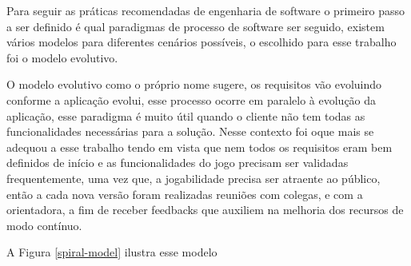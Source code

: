 Para seguir as práticas recomendadas de engenharia de software o primeiro passo a ser definido é qual paradigmas de processo de software ser seguido, existem vários modelos para diferentes cenários possíveis, o escolhido para esse trabalho foi o modelo evolutivo.

O modelo evolutivo como o próprio nome sugere, os requisitos vão evoluindo conforme a aplicação evolui, esse processo ocorre em paralelo à evolução da aplicação, esse paradigma é muito útil quando o cliente não tem todas as funcionalidades necessárias para a solução. Nesse contexto foi oque mais se adequou a esse trabalho tendo em vista que nem todos os requisitos eram bem definidos de início e as funcionalidades do jogo precisam ser validadas frequentemente, uma vez que, a jogabilidade precisa ser atraente ao público, então a cada nova versão foram realizadas reuniões com colegas, e com a orientadora, a fim de receber feedbacks que auxiliem na melhoria dos recursos de modo contínuo.

A Figura \ref{spiral-model} ilustra esse modelo


